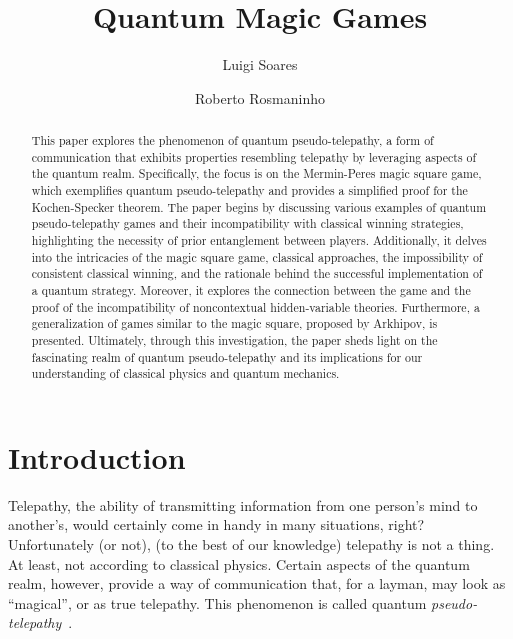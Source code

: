 \documentclass{llncs}
\begin{document}
\title{Quantum Magic Games}

\author{Luigi Soares \and Roberto Rosmaninho}

\maketitle
\begin{abstract}
This paper explores the phenomenon of quantum pseudo-telepathy, a form of communication that exhibits properties resembling telepathy by leveraging aspects of the quantum realm. Specifically, the focus is on the Mermin-Peres magic square game, which exemplifies quantum pseudo-telepathy and provides a simplified proof for the Kochen-Specker theorem. The paper begins by discussing various examples of quantum pseudo-telepathy games and their incompatibility with classical winning strategies, highlighting the necessity of prior entanglement between players. Additionally, it delves into the intricacies of the magic square game, classical approaches, the impossibility of consistent classical winning, and the rationale behind the successful implementation of a quantum strategy. Moreover, it explores the connection between the game and the proof of the incompatibility of noncontextual hidden-variable theories. Furthermore, a generalization of games similar to the magic square, proposed by Arkhipov, is presented. Ultimately, through this investigation, the paper sheds light on the fascinating realm of quantum pseudo-telepathy and its implications for our understanding of classical physics and quantum mechanics.
\end{abstract}

\section{Introduction}
\label{sec:intro}

Telepathy, the ability of transmitting information from one
person's mind to another's, would certainly come in handy in
many situations, right? Unfortunately (or not), (to the best
of our knowledge) telepathy is not a thing. At least, not
according to classical physics. Certain aspects of the
quantum realm, however, provide a way of communication that,
for a layman, may look as ``magical'', or as true telepathy. This
phenomenon is called quantum
\emph{pseudo-telepathy}~\cite{brassard:2005}.
\end{document}
